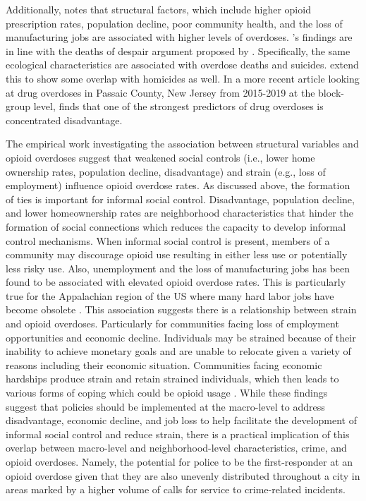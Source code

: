 Additionally, \textcite{feldmeyer_community_2022} notes that structural factors, which include higher opioid prescription rates, population decline, poor community health, and the loss of manufacturing jobs are associated with higher levels of overdoses. \textcite{feldmeyer_community_2022}'s findings are in line with the deaths of despair argument proposed by \textcite{case_rising_2015, case_mortality_2017}. Specifically, the same ecological characteristics are associated with overdose deaths and suicides. \textcite{feldmeyer_community_2022} extend this to show some overlap with homicides as well. In a more recent article looking at drug overdoses in Passaic County, New Jersey from 2015-2019 at the block-group level, \textcite{piza_drug_2023} finds that one of the strongest predictors of drug overdoses is concentrated disadvantage. 

The empirical work investigating the association between structural variables and opioid overdoses suggest that weakened social controls (i.e., lower home ownership rates, population decline, disadvantage) and strain (e.g., loss of employment) influence opioid overdose rates. As discussed above, the formation of ties is important for informal social control. Disadvantage, population decline, and lower homeownership rates are neighborhood characteristics that hinder the formation of social connections which reduces the capacity to develop informal control mechanisms. When informal social control is present, members of a community may discourage opioid use resulting in either less use or potentially less risky use. Also, unemployment and the loss of manufacturing jobs has been found to be associated with elevated opioid overdose rates. This is particularly true for the Appalachian region of the US where many hard labor jobs have become obsolete \parencite{mclean_theres_2016}. This association suggests there is a relationship between strain and opioid overdoses. Particularly for communities facing loss of employment opportunities and economic decline. Individuals may be strained because of their inability to achieve monetary goals and are unable to relocate given a variety of reasons including their economic situation. Communities facing economic hardships produce strain and retain strained individuals, which then leads to various forms of coping which could be opioid usage \parencite{monnat_factors_2018, monnat_contributions_2019}. While these findings suggest that policies should be implemented at the macro-level to address disadvantage, economic decline, and job loss to help facilitate the development of informal social control and reduce strain, there is a practical implication of this overlap between macro-level and neighborhood-level characteristics, crime, and opioid overdoses. Namely, the potential for police to be the first-responder at an opioid overdose given that they are also unevenly distributed throughout a city in areas marked by a higher volume of calls for service to crime-related incidents.

